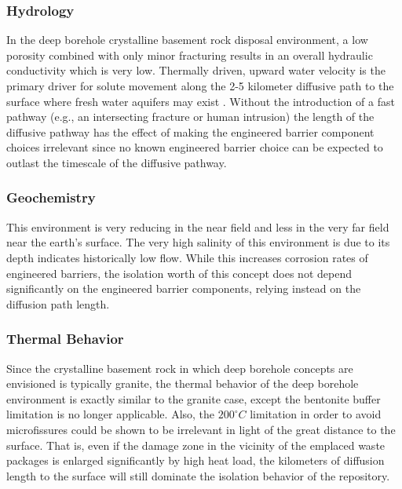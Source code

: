 \subsubsection{Hydrology}

In the deep borehole crystalline basement rock disposal environment, a low porosity
combined with only minor fracturing results in an overall 
hydraulic conductivity which is very low. Thermally driven, upward water 
velocity is the primary driver for solute movement along the 2-5
kilometer diffusive path to the surface where fresh water aquifers may exist
\cite{clayton_generic_2011}.
Without the introduction of a fast pathway (e.g., an intersecting fracture or 
human intrusion) the length of the diffusive pathway has the effect of making the 
engineered barrier component choices irrelevant since no known engineered 
barrier choice can be expected to outlast the timescale of the diffusive pathway.

\subsubsection{Geochemistry}

This environment is very reducing in the near field and less in the very 
far field near the earth's surface. The very high salinity of this environment
is due to its depth indicates historically low flow. While this increases 
corrosion rates of engineered barriers, the isolation worth of this concept 
does not depend significantly on the engineered barrier components, relying 
instead on the diffusion path length.  


\subsubsection{Thermal Behavior}
\label{subsec:boreholethermal}

Since the crystalline basement rock in which deep borehole concepts are 
envisioned is typically granite, the thermal behavior of the deep borehole 
environment is exactly similar to the granite case, except the bentonite buffer 
limitation is no longer applicable.  Also, the $200^{\circ}C$ limitation in 
order to avoid microfissures could  be shown to be irrelevant in light of the 
great distance to the surface. That is, even if the damage zone in the vicinity 
of the emplaced waste packages is enlarged significantly by high heat load, 
the kilometers of diffusion length to the surface will still dominate the 
isolation behavior of the repository. 


